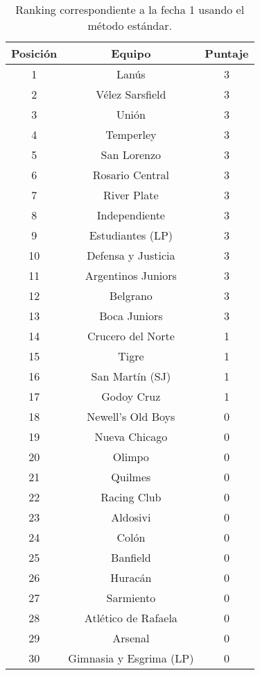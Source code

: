 \begin{table}
	\center
	\begin{tabular}{| c | c | c |}
	  	\hline
	  	Posición & Equipo & Puntaje \\ \hline \hline
		1 & Lanús & 3 \\ \hline
		2 & Vélez Sarsfield & 3 \\ \hline
		3 & Unión & 3 \\ \hline
		4 & Temperley & 3 \\ \hline
		5 & San Lorenzo & 3 \\ \hline
		6 & Rosario Central & 3 \\ \hline
		7 & River Plate & 3 \\ \hline
		8 & Independiente & 3 \\ \hline
		9 & Estudiantes (LP) & 3 \\ \hline
		10 & Defensa y Justicia & 3 \\ \hline
		11 & Argentinos Juniors & 3 \\ \hline
		12 & Belgrano & 3 \\ \hline
		13 & Boca Juniors & 3 \\ \hline
		14 & Crucero del Norte & 1 \\ \hline
		15 & Tigre & 1 \\ \hline
		16 & San Martín (SJ) & 1 \\ \hline
		17 & Godoy Cruz & 1 \\ \hline
		18 & Newell's Old Boys & 0 \\ \hline
		19 & Nueva Chicago & 0 \\ \hline
		20 & Olimpo & 0 \\ \hline
		21 & Quilmes & 0 \\ \hline
		22 & Racing Club & 0 \\ \hline
		23 & Aldosivi & 0 \\ \hline
		24 & Colón & 0 \\ \hline
		25 & Banfield & 0 \\ \hline
		26 & Huracán & 0 \\ \hline
		27 & Sarmiento & 0 \\ \hline
		28 & Atlético de Rafaela & 0 \\ \hline
		29 & Arsenal & 0 \\ \hline
		30 & Gimnasia y Esgrima (LP) & 0 \\ \hline
	\end{tabular}
	\caption{\footnotesize Ranking correspondiente a la fecha 1 usando el método estándar.}
\end{table}

